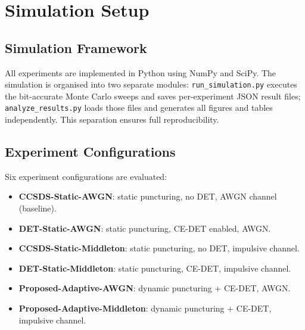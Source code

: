 \documentclass[journal,twocolumn]{IEEEtran}
\begin{document}
\section{Simulation Setup}
\label{sec:sim}

\subsection{Simulation Framework}
All experiments are implemented in Python using NumPy and SciPy.  The
simulation is organised into two separate modules: \texttt{run\_simulation.py}
executes the bit-accurate Monte Carlo sweeps and saves per-experiment
JSON result files; \texttt{analyze\_results.py} loads those files and
generates all figures and tables independently.  This separation
ensures full reproducibility.

\subsection{Experiment Configurations}
Six experiment configurations are evaluated:
\begin{itemize}
  \item \textbf{CCSDS-Static-AWGN}: static puncturing, no DET, AWGN channel
        (baseline).
  \item \textbf{DET-Static-AWGN}: static puncturing, CE-DET enabled, AWGN.
  \item \textbf{CCSDS-Static-Middleton}: static puncturing, no DET, impulsive channel.
  \item \textbf{DET-Static-Middleton}: static puncturing, CE-DET, impulsive channel.
  \item \textbf{Proposed-Adaptive-AWGN}: dynamic puncturing + CE-DET, AWGN.
  \item \textbf{Proposed-Adaptive-Middleton}: dynamic puncturing + CE-DET, impulsive channel.
\end{itemize}
\end{document}
